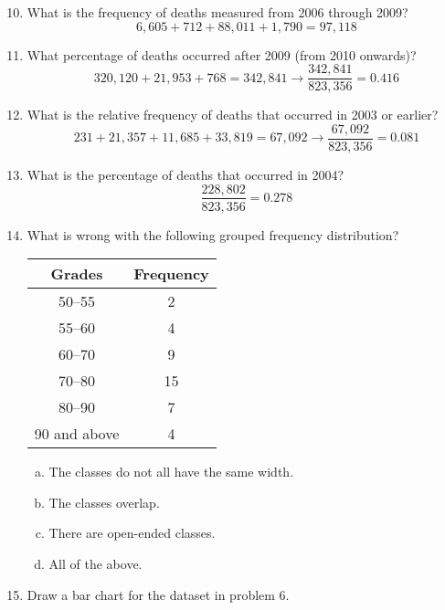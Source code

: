 \begin{enumerate}
\setcounter{enumi}{9}
\item What is the frequency of deaths measured from 2006 through 2009? 
\[6,605 + 712 + 88,011 + 1,790 = 97,118\]

\item What percentage of deaths occurred after 2009 (from 2010 onwards)? 
\[320,120 + 21,953 + 768 = 342,841 \longrightarrow \dfrac{342,841}{823,356} = 0.416\]

\item What is the relative frequency of deaths that occurred in 2003 or earlier? 
\[231 + 21,357 + 11,685 + 33,819 = 67,092 \longrightarrow \dfrac{67,092}{823,356} = 0.081\]

\item What is the percentage of deaths that occurred in 2004? 
\[\dfrac{228,802}{823,356} = 0.278\]

\item What is wrong with the following grouped frequency distribution?
\begin{center}
\begin{tabular}{c | c}
\textbf{Grades} & \textbf{Frequency}\\
\hline
50--55 & 2\\
55--60 & 4\\
60--70 & 9\\
70--80 & 15\\
80--90 & 7\\
90 and above & 4
\end{tabular}
\end{center}
\begin{enumerate}[(a)]
\item The classes do not all have the same width.
\item The classes overlap.
\item There are open-ended classes.
\item All of the above.
\end{enumerate} \text{} 

\item Draw a bar chart for the dataset in problem 6.

\begin{center}
\end{center}


\end{enumerate}
